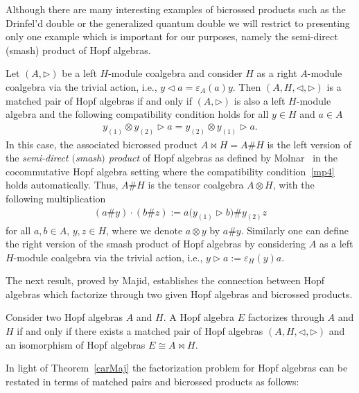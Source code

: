 Although there are many interesting examples of bicrossed products such as the Drinfel'd double \cite[Theorem~IX.3.5]{Kassel} or the generalized quantum double \cite[Example~7.2.6]{majid} we will restrict to presenting only one example which is important for our purposes, namely the semi-direct (smash) product of Hopf algebras.

\begin{Example} \label{exempleban}
Let $(A, \triangleright)$ be a left $H$-module coalgebra and consider $H$ as a right $A$-module coalgebra via the trivial action, i.e., $y \triangleleft a = \varepsilon_A(a) y$. Then $(A,H, \triangleleft, \triangleright)$ is a matched pair of Hopf algebras if and only if $(A, \triangleright)$ is also a left $H$-module algebra and the following compatibility condition holds for all $y \in H$ and $a\in A$
\begin{gather*}
y_{(1)} \otimes y_{(2)} \triangleright a = y_{(2)} \otimes y_{(1)} \triangleright a.
\end{gather*}
In this case, the associated bicrossed product $A\bowtie H = A\# H$ is the left version of the \emph{semi-direct $($smash$)$ product} of Hopf algebras as defined by Molnar~\cite{Mo} in the cocommutative Hopf algebra setting where the compatibility condition~\eqref{mp4} holds automatically. Thus, $A\# H$ is the tensor coalgebra $A\otimes H$, with the following multiplication
\begin{gather*}
(a \# y) \cdot (b \# z):= a \big(y_{(1)} \triangleright b \big) \# y_{(2)} z
\end{gather*}
for all $a, b\in A$, $y, z\in H$, where we denote $a\otimes y$ by $a\# y$. Similarly one can define the right version of the smash product of Hopf algebras by considering $A$ as a left $H$-module coalgebra via the trivial action, i.e., $y \triangleright a := \varepsilon_H(y) a$.
\end{Example}

The next result, proved by Majid, establishes the connection between Hopf algebras which factorize through two given Hopf algebras and bicrossed products.

\begin{Theorem}\label{carMaj}
Consider two Hopf algebras $A$ and $H$. A Hopf algebra $E$ factorizes through $A$ and $H$ if and only if there exists a matched pair of Hopf algebras $(A, H, \triangleleft, \triangleright)$ and an isomorphism of Hopf algebras $E \cong A \bowtie H$.
\end{Theorem}
In light of Theorem~\ref{carMaj} the factorization problem for Hopf
algebras can be restated in terms of matched pairs and bicrossed products as follows:

